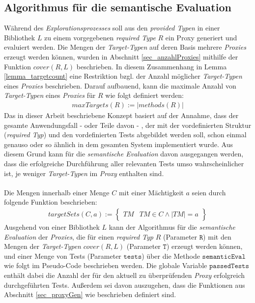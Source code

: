 \subsection{Algorithmus für die semantische Evaluation}\label{sec_semEvalAlgo}
Während des \emph{Explorationsprozesses} soll aus den \emph{provided Typen} in einer Bibliothek $L$ zu einem vorgegebenen \emph{required Type} $R$ ein Proxy generiert und evaluiert werden. Die Mengen der \emph{Target-Typen} auf deren Basis mehrere \emph{Proxies} erzeugt werden können, wurden in Abschnitt \ref{sec_anzahlProxies} mithilfe der Funktion $\mathit{cover(R,L)}$ beschrieben. In diesem Zusammenhang in Lemma \ref{lemma_targetcount} eine Restriktion bzgl. der Anzahl möglicher \emph{Target-Typen} eines \emph{Proxies} beschrieben.
Darauf aufbauend, kann die maximale Anzahl von \emph{Target-Typen} eines \emph{Proxies} für $R$ wie folgt definiert werden:
\begin{gather*}
\mathit{maxTargets(R)} := |\mathit{methods(R)}|
\end{gather*}
\noindent
Das in dieser Arbeit beschriebene Konzept basiert auf der Annahme, dass der gesamte Anwendungsfall - oder Teile davon - , der mit der vordefinierten Struktur (\emph{required Typ}) und den vordefinierten Tests abgebildet werden soll, schon einmal genauso oder so ähnlich in dem gesamten System implementiert wurde. Aus diesem Grund kann für die \emph{semantische Evaluation} davon ausgegangen werden, dass die erfolgreiche Durchführung aller relevanten Tests umso wahrscheinlicher ist, je weniger \emph{Target-Typen} im \emph{Proxy} enthalten sind.
\\\\
Die Mengen innerhalb einer Menge $\mathit{C}$ mit einer Mächtigkeit $a$ seien durch folgende Funktion beschrieben:
\begin{gather*}
\mathit{targetSets(\mathit{C},a)} := 
\left\{\begin{array}{l|l}	
				\mathit{TM} & \mathit{TM} \in \mathit{C} \wedge |\mathit{TM}| = a
		 \end{array}
\right\}
\end{gather*}
\noindent
Ausgehend von einer Bibliothek $L$ kann der Algorithmus für die \emph{semantische Evaluation} der \emph{Proxies}, die für einen \emph{required Typ} $R$ (Parameter $\texttt{R}$) mit den Mengen der \emph{Target-Typen} $\mathit{cover(R, L)}$ (Parameter $\texttt{T}$) erzeugt werden können, und einer Menge von Tests (Parameter $\texttt{tests}$) über die Methode $\texttt{semanticEval}$ wie folgt im Pseudo-Code beschrieben werden. Die globale Variable $\texttt{passedTests}$ enthält dabei die Anzahl der für den aktuell zu überprüfenden \emph{Proxy} erfolgreich durchgeführten Tests. Außerdem sei davon auszugehen, dass die Funktionen aus Abschnitt \ref{sec_proxyGen} wie beschrieben definiert sind.
